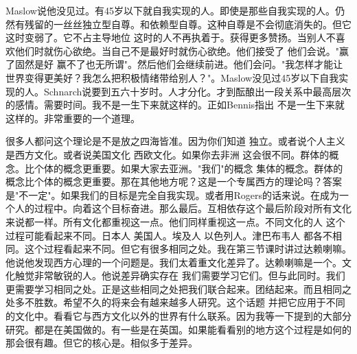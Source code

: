 Maslow说他没见过。有45岁以下就自我实现的人。即使是那些自我实现的人。仍然有残留的一丝丝独立型自尊。和依赖型自尊。这种自尊是不会彻底消失的。但它这时变弱了。它不占主导地位 这时的人不再执着于。获得更多赞扬。当别人不喜欢他们时就伤心欲绝。当自己不是最好时就伤心欲绝。他们接受了 他们会说。"赢了固然是好 赢不了也无所谓"。然后他们会继续前进。他们会问。"我怎样才能让世界变得更美好？我怎么把积极情绪带给别人？"。Maslow没见过45岁以下自我实现的人。Schnarch说要到五六十岁时。人才分化。才到酝酿出一段关系中最高层次的感情。需要时间。我不是一生下来就这样的。正如Bennis指出 不是一生下来就这样的。非常重要的一个道理。 

很多人都问这个理论是不是放之四海皆准。因为你们知道 独立。或者说个人主义 是西方文化。或者说美国文化 西欧文化。如果你去非洲 这会很不同。群体的概念。比个体的概念更重要。如果大家去亚洲。"我们"的概念 集体的概念。群体的概念比个体的概念更重要。那在其他地方呢？这是一个专属西方的理论吗？答案是"不一定"。如果我们的目标是完全自我实现。或者用Rogers的话来说。在成为一个人的过程中。向着这个目标奋进。那么最后。互相依存这个最后阶段对所有文化来说都一样。所有文化都重视这一点。他们同样重视这一点。不同文化的人 这个过程可能看起来不同。日本人 美国人。埃及人 以色列人。津巴布韦人 都各不相同。这个过程看起来不同。但它有很多相同之处。我在第三节课时讲过达赖喇嘛。他说他发现西方心理的一个问题是。我们太着重文化差异了。达赖喇嘛是一个。文化触觉非常敏锐的人。他说差异确实存在 我们需要学习它们。但与此同时。我们更需要学习相同之处。正是这些相同之处把我们联合起来。团结起来。而且相同之处多不胜数。希望不久的将来会有越来越多人研究。这个话题 并把它应用于不同的文化中。看看它与西方文化以外的世界有什么联系。因为我等一下提到的大部分研究。都是在美国做的。有一些是在英国。如果能看看别的地方这个过程是如何的 那会很有趣。但它的核心是。相似多于差异。 


